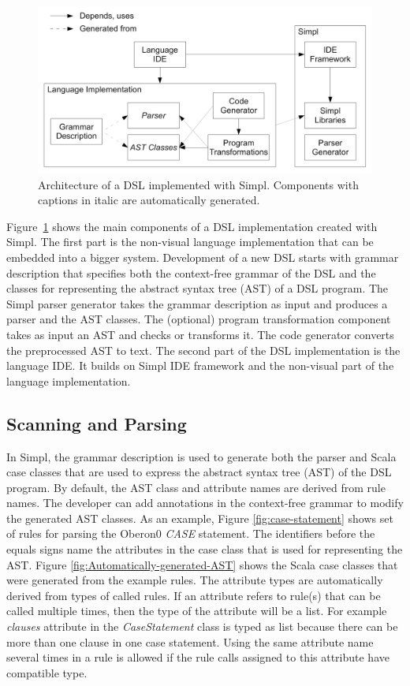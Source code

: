 %
\begin{figure}[!h]
\begin{centering}
\includegraphics[width=0.7\columnwidth]{simpl/architecture.pdf}
\par\end{centering}

\caption{\label{fig:architecture}Architecture of a DSL implemented with Simpl.
Components with captions in italic are automatically generated.}

\end{figure}


Figure~\ref{fig:architecture} shows the main components of a DSL
implementation created with Simpl. The first part is the non-visual
language implementation that can be embedded into a bigger system.
Development of a new DSL starts with grammar description that specifies
both the context-free grammar of the DSL and the classes for representing
the abstract syntax tree (AST) of a DSL program. The Simpl parser
generator takes the grammar description as input and produces a parser
and the AST classes. The (optional) program transformation component
takes as input an AST and checks or transforms it. The code generator
converts the preprocessed AST to text. The second part of the DSL
implementation is the language IDE. It builds on Simpl IDE framework
and the non-visual part of the language implementation.


\subsection{Scanning and Parsing}

In Simpl, the grammar description is used to generate both the parser
and Scala case classes that are used to express the abstract syntax
tree (AST) of the DSL program. By default, the AST class and attribute
names are derived from rule names. The developer can add annotations
in the context-free grammar to modify the generated AST classes. As
an example, Figure \ref{fig:case-statement} shows set of rules for
parsing the Oberon0 \emph{CASE} statement. The identifiers before
the equals signs name the attributes in the case class that is used
for representing the AST. Figure \ref{fig:Automatically-generated-AST}
shows the Scala case classes that were generated from the example
rules. The attribute types are automatically derived from types of
called rules. If an attribute refers to rule(s) that can be called
multiple times, then the type of the attribute will be a list. For
example \emph{clauses} attribute in the \emph{CaseStatement} class
is typed as list because there can be more than one clause in one
case statement. Using the same attribute name several times in a rule
is allowed if the rule calls assigned to this attribute have compatible
type.

